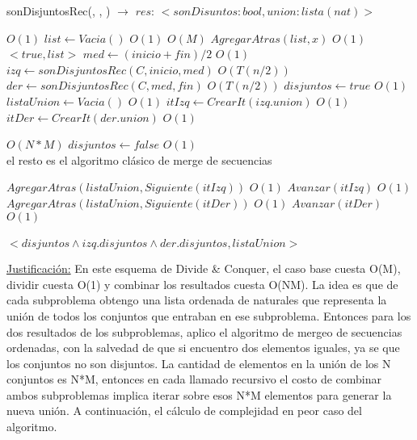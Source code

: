 \documentclass[10pt, a4paper]{article}
\begin{document}
\begin{algorithm}[H]{sonDisjuntosRec(, , ) $\to$ $res$: $<sonDisuntos: bool, union: lista(nat)>$}	
	\begin{algorithmic}[1]
							\Comment $O(1)$
			\State $list \gets Vacia()$			\Comment $O(1)$
			 			\Comment $O(M)$
			 	\State $AgregarAtras(list, x)$	\Comment $O(1)$
			 \EndFor \\
			\Return $<true, list>$
		\Else
			\State $med \gets (inicio + fin)/2$	\Comment $O(1)$
			\State $izq \gets sonDisjuntosRec(C, inicio, med)$	\Comment $O(T(n/2))$
			\State $der \gets sonDisjuntosRec(C, med, fin)$	\Comment $O(T(n/2))$
			\State $disjuntos \gets true$	\Comment $O(1)$
			\State $listaUnion \gets Vacia()$	\Comment $O(1)$
			\State $itIzq \gets CrearIt(izq.union)$	\Comment $O(1)$
			\State $itDer \gets CrearIt(der.union)$	\Comment $O(1)$
			
						\Comment $O(N*M)$
				\State $disjuntos \gets false$	\Comment $O(1)$
				\EndIf \\
				\Comment el resto es el algoritmo clásico de merge de secuencias

					\State $AgregarAtras(listaUnion, Siguiente(itIzq))$	\Comment $O(1)$
					\State $Avanzar(itIzq)$	\Comment $O(1)$
				\Else
					\State $AgregarAtras(listaUnion, Siguiente(itDer))$	\Comment $O(1)$
					\State $Avanzar(itDer)$	\Comment $O(1)$
				\EndIf	 	
			\EndWhile \\
			
		\EndIf	\\
		\Return $<disjuntos \wedge izq.disjuntos \wedge der.disjuntos, listaUnion>$
	
		\medskip
		\Statex \underline{Justificación:} En este esquema de Divide \& Conquer, el caso base cuesta O(M), dividir cuesta O(1) y combinar los resultados cuesta O(NM). La idea es que de cada subproblema obtengo una lista ordenada de naturales que representa la unión de todos los conjuntos que entraban en ese subproblema. Entonces para los dos resultados de los subproblemas, aplico el algoritmo de mergeo de secuencias ordenadas, con la salvedad de que si encuentro dos elementos iguales, ya se que los conjuntos no son disjuntos. La cantidad de elementos en la unión de los N conjuntos es N*M, entonces en cada llamado recursivo el costo de combinar ambos subproblemas implica iterar sobre esos N*M elementos para generar la nueva unión. A continuación, el cálculo de complejidad en peor caso del algoritmo.
    \end{algorithmic}
\end{algorithm}	
\end{document}
